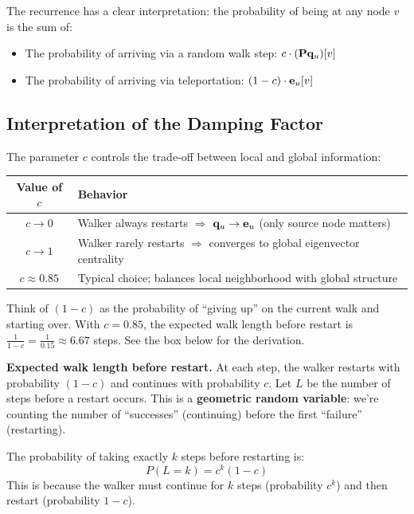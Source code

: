 \begin{notechapter}
\begin{intuition}
The recurrence has a clear interpretation: the probability of being at any node $v$ is the sum of:
\begin{itemize}
    \item The probability of arriving via a random walk step: $c \cdot (\mathbf{P} \mathbf{q}_u)[v]$
    \item The probability of arriving via teleportation: $(1-c) \cdot \mathbf{e}_u[v]$
\end{itemize}
\end{intuition}

\subsection{Interpretation of the Damping Factor}

The parameter $c$ controls the trade-off between local and global information:

\begin{center}
\begin{tabular}{cl}
\toprule
\textbf{Value of $c$} & \textbf{Behavior} \\
\midrule
$c \to 0$ & Walker always restarts $\Rightarrow$ $\mathbf{q}_u \to \mathbf{e}_u$ (only source node matters) \\
$c \to 1$ & Walker rarely restarts $\Rightarrow$ converges to global eigenvector centrality \\
$c \approx 0.85$ & Typical choice; balances local neighborhood with global structure \\
\bottomrule
\end{tabular}
\end{center}

\begin{intuition}
Think of $(1-c)$ as the probability of ``giving up'' on the current walk and starting over. With $c = 0.85$, the expected walk length before restart is $\frac{1}{1-c} = \frac{1}{0.15} \approx 6.67$ steps. See the box below for the derivation.
\end{intuition}

\begin{example}
\textbf{Expected walk length before restart.} At each step, the walker restarts with probability $(1-c)$ and continues with probability $c$. Let $L$ be the number of steps before a restart occurs. This is a \textbf{geometric random variable}: we're counting the number of ``successes'' (continuing) before the first ``failure'' (restarting).

The probability of taking exactly $k$ steps before restarting is:
\[
P(L = k) = c^k (1-c)
\]
This is because the walker must continue for $k$ steps (probability $c^k$) and then restart (probability $1-c$).


\end{example}
\end{notechapter}
